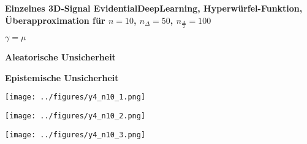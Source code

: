 \begin{otherlanguage}{ngerman}
\begin{samepage}
\begin{minipage}{\textwidth}
\end{minipage}
\end{samepage}




\begin{samepage}
\begin{minipage}{\textwidth}

\noindent\textbf{Einzelnes 3D-Signal \gls{EvidentialDeepLearning}, Hyperwürfel-Funktion,
Überapproximation für $n=10$, $n_{\Delta}=50$, $n_{\frac{\Delta}{2}}=100$}


\begin{minipage}{0.05\textwidth}\vspace{0.5cm}\end{minipage}%
\begin{minipage}{0.3\textwidth}\centering \textbf{$\gamma=\mu$}\end{minipage}%
\begin{minipage}{0.3\textwidth}\centering \textbf{Aleatorische Unsicherheit}\end{minipage}%
\begin{minipage}{0.3\textwidth}\centering \textbf{Epistemische Unsicherheit}\end{minipage}

\vspace{0.125cm}

\begin{minipage}{0.05\textwidth}\centering{}\end{minipage}%
\begin{minipage}{0.3\textwidth}\centering\texttt{[image: ../figures/y4\_n10\_1.png]}\end{minipage}%
\begin{minipage}{0.3\textwidth}\centering\texttt{[image: ../figures/y4\_n10\_2.png]}\end{minipage}%
\begin{minipage}{0.3\textwidth}\centering\texttt{[image: ../figures/y4\_n10\_3.png]}\end{minipage}

\vspace{0.125cm}


\end{minipage}
\end{samepage}
\end{otherlanguage}
